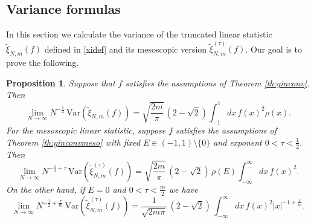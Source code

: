 \documentclass[11pt,reqno]{amsproc}
\newtheorem{proposition}[theorem]{Proposition}
\numberwithin{equation}{section}
\numberwithin{theorem}{section}
\begin{document}
\subsection{Variance formulas}
\label{se:variance}
In this section we calculate the variance of the truncated linear statistic $\tilde{\xi}_{N,m}(f)$ defined in \eqref{xidef} and its mesoscopic version $\tilde{\xi}^{(\tau)}_{N,m}(f)$. Our goal is to prove the following.
\begin{proposition}
\label{prop:var}
Suppose that $f$ satisfies the assumptions of Theorem \ref{th:ginconv}. Then
\begin{equation}
\lim_{N \to \infty}N^{-\frac{1}{2}}\,\mathrm{Var}(\tilde{\xi}_{N,m}(f)) = \sqrt{\frac{2m}{\pi}}\,(2-\sqrt{2})\int_{-1}^{1}dx\,f(x)^{2}\rho(x). \label{varreals}
\end{equation}
For the mesoscopic linear statistic, suppose $f$ satisfies the assumptions of Theorem \ref{th:ginconvmeso} with fixed $E \in (-1,1)\setminus\{0\}$ and exponent $0 < \tau < \frac{1}{2}$. Then\begin{equation}
\lim_{N \to \infty}N^{-\frac{1}{2}+\tau}\,\mathrm{Var}(\tilde{\xi}^{(\tau)}_{N,m}(f)) = \sqrt{\frac{2m}{\pi}}\,(2-\sqrt{2})\,\rho(E)\int_{-\infty}^{\infty}dx\,f(x)^{2}. \label{mesovarform}
\end{equation}
On the other hand, if $E=0$ and $0 < \tau < \frac{m}{2}$ we have
\begin{equation}
\label{meso0varform}
\lim_{N \to \infty}N^{-\frac{1}{2}+\frac{\tau}{m}}\,\mathrm{Var}(\tilde{\xi}^{(\tau)}_{N,m}(f)) = \frac{1}{\sqrt{2m\pi}}\,(2-\sqrt{2})\,\int_{-\infty}^{\infty}dx\,f(x)^{2}|x|^{-1+\frac{1}{m}}.
\end{equation}
\end{proposition}
\end{document}
